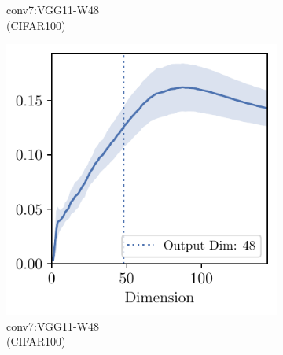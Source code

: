 \begin{figure}[h]
\begin{subfigure}[b]{0.23\textwidth}
        \caption{conv7:VGG11-W48\\(CIFAR100)}
        \label{fig:app_adexp_overlap_late_vgg_cifar100}
    \end{subfigure}
    \begin{subfigure}[b]{0.23\textwidth}
        \centering
        \captionsetup{justification=centering}
        \includegraphics[width=\textwidth]{Appendix_Figures/Overlap_large_model/FailCases/late/CIFAR100_Resnet18W48New_nobn_fixlr0.01_conv7.pdf}
        \caption{conv7:VGG11-W48\\(CIFAR100)}
        \label{fig:app_adexp_overlap_late_resnet48}
    \end{subfigure}
    \begin{subfigure}[b]{0.23\textwidth}
        \centering
        \captionsetup{justification=centering}

\end{subfigure}
\end{figure}
